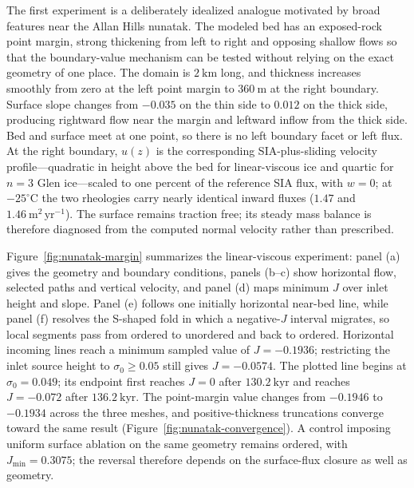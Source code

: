\documentclass[review]{igs}
\begin{document}
The first experiment is a deliberately idealized analogue motivated by broad features near the Allan Hills nunatak. The modeled bed has an exposed-rock point margin, strong thickening from left to right and opposing shallow flows so that the boundary-value mechanism can be tested without relying on the exact geometry of one place. The domain is \(2~\mathrm{km}\) long, and thickness increases smoothly from zero at the left point margin to \(360~\mathrm{m}\) at the right boundary. Surface slope changes from \(-0.035\) on the thin side to \(0.012\) on the thick side, producing rightward flow near the margin and leftward inflow from the thick side. Bed and surface meet at one point, so there is no left boundary facet or left flux. At the right boundary, \(u(z)\) is the corresponding SIA-plus-sliding velocity profile---quadratic in height above the bed for linear-viscous ice and quartic for \(n=3\) Glen ice---scaled to one percent of the reference SIA flux, with \(w=0\); at \(-25^{\circ}\mathrm{C}\) the two rheologies carry nearly identical inward fluxes (\(1.47\) and \(1.46~\mathrm{m^2\,yr^{-1}}\)). The surface remains traction free; its steady mass balance is therefore diagnosed from the computed normal velocity rather than prescribed.

Figure~\ref{fig:nunatak-margin} summarizes the linear-viscous experiment: panel (a) gives the geometry and boundary conditions, panels (b--c) show horizontal flow, selected paths and vertical velocity, and panel (d) maps minimum \(J\) over inlet height and slope. Panel (e) follows one initially horizontal near-bed line, while panel (f) resolves the S-shaped fold in which a negative-\(J\) interval migrates, so local segments pass from ordered to unordered and back to ordered. Horizontal incoming lines reach a minimum sampled value of \(J=-0.1936\); restricting the inlet source height to \(\sigma_0\geq0.05\) still gives \(J=-0.0574\). The plotted line begins at \(\sigma_0=0.049\); its endpoint first reaches \(J=0\) after \(130.2~\mathrm{kyr}\) and reaches \(J=-0.072\) after \(136.2~\mathrm{kyr}\). The point-margin value changes from \(-0.1946\) to \(-0.1934\) across the three meshes, and positive-thickness truncations converge toward the same result (Figure~\ref{fig:nunatak-convergence}). A control imposing uniform surface ablation on the same geometry remains ordered, with \(J_{\min}=0.3075\); the reversal therefore depends on the surface-flux closure as well as geometry.
\end{document}
